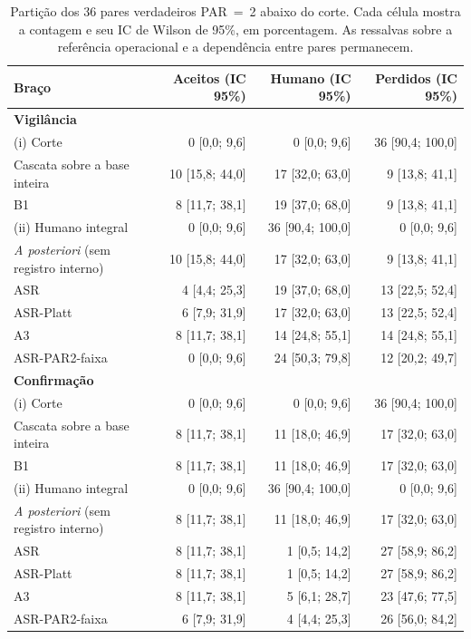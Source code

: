 \begin{longtable}{lrrr}
\caption{Partição dos 36 pares verdadeiros PAR~=~2 abaixo do corte. Cada célula mostra a contagem e seu IC de Wilson de 95\%, em porcentagem. As ressalvas sobre a referência operacional e a dependência entre pares permanecem.}
\label{tab:cap8-arranjo-corte-par2}\\
\toprule
Braço & Aceitos (IC 95\%) & Humano (IC 95\%) & Perdidos (IC 95\%) \\
\midrule
\multicolumn{4}{l}{\textbf{Vigilância}} \\
(i) Corte & 0 [0,0; 9,6] & 0 [0,0; 9,6] & 36 [90,4; 100,0] \\
Cascata sobre a base inteira & 10 [15,8; 44,0] & 17 [32,0; 63,0] & 9 [13,8; 41,1] \\
B1 & 8 [11,7; 38,1] & 19 [37,0; 68,0] & 9 [13,8; 41,1] \\
(ii) Humano integral & 0 [0,0; 9,6] & 36 [90,4; 100,0] & 0 [0,0; 9,6] \\
\textit{A posteriori} (sem registro interno) & 10 [15,8; 44,0] & 17 [32,0; 63,0] & 9 [13,8; 41,1] \\
ASR & 4 [4,4; 25,3] & 19 [37,0; 68,0] & 13 [22,5; 52,4] \\
ASR-Platt & 6 [7,9; 31,9] & 17 [32,0; 63,0] & 13 [22,5; 52,4] \\
A3 & 8 [11,7; 38,1] & 14 [24,8; 55,1] & 14 [24,8; 55,1] \\
ASR-PAR2-faixa & 0 [0,0; 9,6] & 24 [50,3; 79,8] & 12 [20,2; 49,7] \\
\midrule
\multicolumn{4}{l}{\textbf{Confirmação}} \\
(i) Corte & 0 [0,0; 9,6] & 0 [0,0; 9,6] & 36 [90,4; 100,0] \\
Cascata sobre a base inteira & 8 [11,7; 38,1] & 11 [18,0; 46,9] & 17 [32,0; 63,0] \\
B1 & 8 [11,7; 38,1] & 11 [18,0; 46,9] & 17 [32,0; 63,0] \\
(ii) Humano integral & 0 [0,0; 9,6] & 36 [90,4; 100,0] & 0 [0,0; 9,6] \\
\textit{A posteriori} (sem registro interno) & 8 [11,7; 38,1] & 11 [18,0; 46,9] & 17 [32,0; 63,0] \\
ASR & 8 [11,7; 38,1] & 1 [0,5; 14,2] & 27 [58,9; 86,2] \\
ASR-Platt & 8 [11,7; 38,1] & 1 [0,5; 14,2] & 27 [58,9; 86,2] \\
A3 & 8 [11,7; 38,1] & 5 [6,1; 28,7] & 23 [47,6; 77,5] \\
ASR-PAR2-faixa & 6 [7,9; 31,9] & 4 [4,4; 25,3] & 26 [56,0; 84,2] \\
\bottomrule
\end{longtable}
